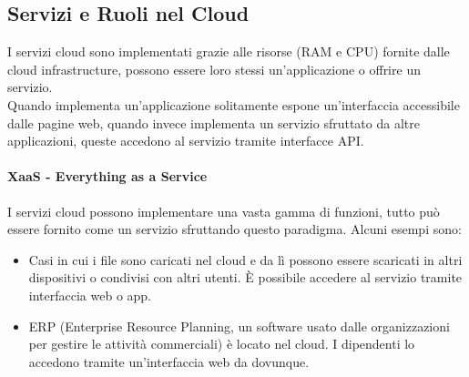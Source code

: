 \documentclass{article}
\begin{document}
\subsection{Servizi e Ruoli nel Cloud}
I servizi cloud sono implementati grazie alle risorse (RAM e CPU) fornite dalle cloud infrastructure, possono essere loro stessi un’applicazione o offrire un servizio.\\
Quando implementa un’applicazione solitamente espone un’interfaccia accessibile dalle pagine web, quando invece implementa un servizio sfruttato da altre applicazioni, queste accedono al servizio tramite interfacce API.  

\paragraph{XaaS - Everything as a Service}
I servizi cloud possono implementare una vasta gamma di funzioni, tutto può essere fornito come un servizio sfruttando questo paradigma. Alcuni esempi sono:
\begin{itemize}
    \item Casi in cui i file sono caricati nel cloud e da lì possono essere scaricati in altri dispositivi o condivisi con altri utenti. È possibile accedere al servizio tramite interfaccia web o app.
    \item ERP (Enterprise Resource Planning, un software usato dalle organizzazioni per gestire le attività commerciali) è locato nel cloud. I dipendenti lo accedono tramite un’interfaccia web da dovunque.
\end{itemize}
\end{document}
